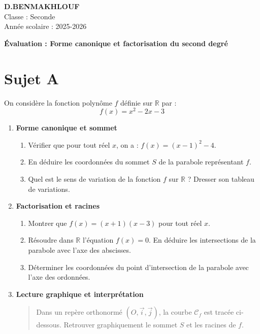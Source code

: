 \documentclass[11pt,a4paper]{article}
\begin{document}
\noindent
\textbf{D.BENMAKHLOUF} \\
Classe : Seconde \\
Année scolaire : 2025-2026

\vspace{0.5cm}

\begin{center}
\textbf{\Large Évaluation : Forme canonique et factorisation du second degré}
\end{center}

\vspace{0.3cm}

\section*{Sujet A}

On considère la fonction polynôme $f$ définie sur $\mathbb{R}$ par :
$$f(x) = x^2 - 2x - 3$$

\begin{enumerate}
    \item \textbf{Forme canonique et sommet}
    \begin{enumerate}
        \item Vérifier que pour tout réel $x$, on a : $f(x) = (x - 1)^2 - 4$.
        \item En déduire les coordonnées du sommet $S$ de la parabole représentant $f$.
        \item Quel est le sens de variation de la fonction $f$ sur $\mathbb{R}$ ? Dresser son tableau de variations.
    \end{enumerate}
    
    \item \textbf{Factorisation et racines}
    \begin{enumerate}
        \item Montrer que $f(x) = (x + 1)(x - 3)$ pour tout réel $x$.
        \item Résoudre dans $\mathbb{R}$ l'équation $f(x) = 0$. En déduire les intersections de la parabole avec l'axe des abscisses.
        \item Déterminer les coordonnées du point d'intersection de la parabole avec l'axe des ordonnées.
    \end{enumerate}
    
    \item \textbf{Lecture graphique et interprétation}
    \begin{quotation}
    Dans un repère orthonormé $(O, \vec{i}, \vec{j})$, la courbe $\mathcal{C}_f$ est tracée ci-dessous. Retrouver graphiquement le sommet $S$ et les racines de $f$.
    \end{quotation}
\end{enumerate}
\end{document}
